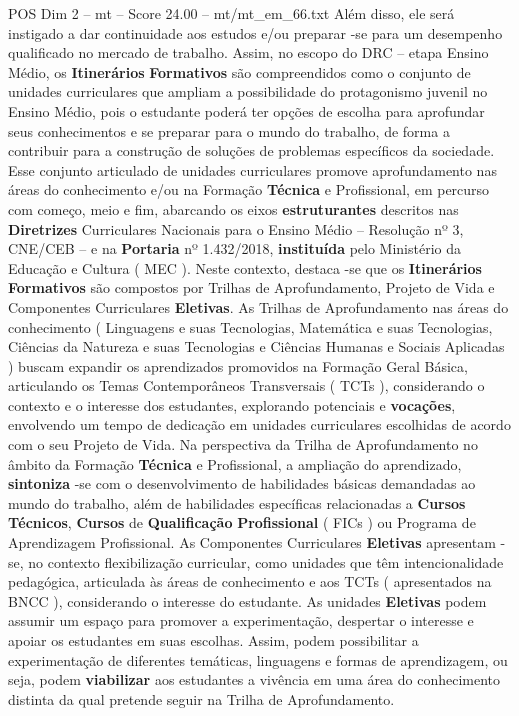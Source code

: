 \begin{textsample}{POS Dim 2 – mt – Score 24.00 – mt/mt\_em\_66.txt}
Além disso, ele será instigado a dar continuidade aos estudos e/ou preparar -se para um desempenho qualificado no mercado de trabalho.
Assim, no escopo do DRC – etapa Ensino Médio, os \textbf{Itinerários} \textbf{Formativos} são compreendidos como o conjunto de unidades curriculares que ampliam a possibilidade do protagonismo juvenil no Ensino Médio, pois o estudante poderá ter opções de escolha para aprofundar seus conhecimentos e se preparar para o mundo do trabalho, de forma a contribuir para a construção de soluções de problemas específicos da sociedade.
Esse conjunto articulado de unidades curriculares promove aprofundamento nas áreas do conhecimento e/ou na Formação \textbf{Técnica} e Profissional, em percurso com começo, meio e fim, abarcando os eixos \textbf{estruturantes} descritos nas \textbf{Diretrizes} Curriculares Nacionais para o Ensino Médio – Resolução nº 3, CNE/CEB – e na \textbf{Portaria} nº 1.432/2018, \textbf{instituída} pelo Ministério da Educação e Cultura ( MEC ).
Neste contexto, destaca -se que os \textbf{Itinerários} \textbf{Formativos} são compostos por Trilhas de Aprofundamento, Projeto de Vida e Componentes Curriculares \textbf{Eletivas}.
As Trilhas de Aprofundamento nas áreas do conhecimento ( Linguagens e suas Tecnologias, Matemática e suas Tecnologias, Ciências da Natureza e suas Tecnologias e Ciências Humanas e Sociais Aplicadas ) buscam expandir os aprendizados promovidos na Formação Geral Básica, articulando os Temas Contemporâneos Transversais ( TCTs ), considerando o contexto e o interesse dos estudantes, explorando potenciais e \textbf{vocações}, envolvendo um tempo de dedicação em unidades curriculares escolhidas de acordo com o seu Projeto de Vida.
Na perspectiva da Trilha de Aprofundamento no âmbito da Formação \textbf{Técnica} e Profissional, a ampliação do aprendizado, \textbf{sintoniza} -se com o desenvolvimento de habilidades básicas demandadas ao mundo do trabalho, além de habilidades específicas relacionadas a \textbf{Cursos} \textbf{Técnicos}, \textbf{Cursos} de \textbf{Qualificação} \textbf{Profissional} ( FICs ) ou Programa de Aprendizagem Profissional.
As Componentes Curriculares \textbf{Eletivas} apresentam -se, no contexto flexibilização curricular, como unidades que têm intencionalidade pedagógica, articulada às áreas de conhecimento e aos TCTs ( apresentados na BNCC ), considerando o interesse do estudante.
As unidades \textbf{Eletivas} podem assumir um espaço para promover a experimentação, despertar o interesse e apoiar os estudantes em suas escolhas.
Assim, podem possibilitar a experimentação de diferentes temáticas, linguagens e formas de aprendizagem, ou seja, podem \textbf{viabilizar} aos estudantes a vivência em uma área do conhecimento distinta da qual pretende seguir na Trilha de Aprofundamento.

\end{textsample}

